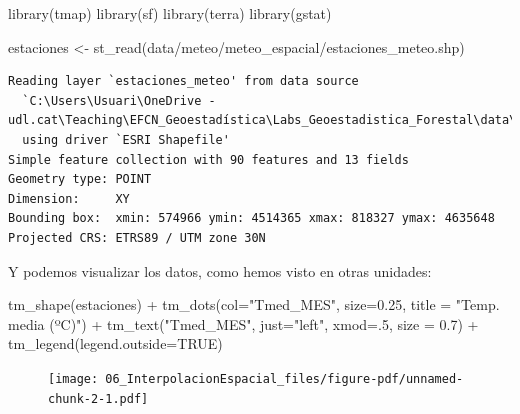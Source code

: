 \documentclass[
  letterpaper,
  DIV=11,
  numbers=noendperiod]{scrreprt}
\newenvironment{Shaded}{\begin{snugshade}}{\end{snugshade}}
\newcommand{\AttributeTok}[1]{\textcolor[rgb]{0.40,0.45,0.13}{#1}}
\newcommand{\ConstantTok}[1]{\textcolor[rgb]{0.56,0.35,0.01}{#1}}
\newcommand{\DecValTok}[1]{\textcolor[rgb]{0.68,0.00,0.00}{#1}}
\newcommand{\FloatTok}[1]{\textcolor[rgb]{0.68,0.00,0.00}{#1}}
\newcommand{\FunctionTok}[1]{\textcolor[rgb]{0.28,0.35,0.67}{#1}}
\newcommand{\NormalTok}[1]{\textcolor[rgb]{0.00,0.23,0.31}{#1}}
\newcommand{\OtherTok}[1]{\textcolor[rgb]{0.00,0.23,0.31}{#1}}
\newcommand{\SpecialCharTok}[1]{\textcolor[rgb]{0.37,0.37,0.37}{#1}}
\newcommand{\StringTok}[1]{\textcolor[rgb]{0.13,0.47,0.30}{#1}}
\begin{document}
\begin{Shaded}
\begin{Highlighting}[]
\FunctionTok{library}\NormalTok{(tmap)}
\FunctionTok{library}\NormalTok{(sf)}
\FunctionTok{library}\NormalTok{(terra)}
\FunctionTok{library}\NormalTok{(gstat)}


\NormalTok{estaciones }\OtherTok{\textless{}{-}} \FunctionTok{st\_read}\NormalTok{(}\StringTok{\textquotesingle{}data/meteo/meteo\_espacial/estaciones\_meteo.shp\textquotesingle{}}\NormalTok{)}
\end{Highlighting}
\end{Shaded}

\begin{verbatim}
Reading layer `estaciones_meteo' from data source 
  `C:\Users\Usuari\OneDrive - udl.cat\Teaching\EFCN_Geoestadística\Labs_Geoestadistica_Forestal\data\meteo\meteo_espacial\estaciones_meteo.shp' 
  using driver `ESRI Shapefile'
Simple feature collection with 90 features and 13 fields
Geometry type: POINT
Dimension:     XY
Bounding box:  xmin: 574966 ymin: 4514365 xmax: 818327 ymax: 4635648
Projected CRS: ETRS89 / UTM zone 30N
\end{verbatim}

Y podemos visualizar los datos, como hemos visto en otras unidades:

\begin{Shaded}
\begin{Highlighting}[]
\FunctionTok{tm\_shape}\NormalTok{(estaciones) }\SpecialCharTok{+}
    \FunctionTok{tm\_dots}\NormalTok{(}\AttributeTok{col=}\StringTok{"Tmed\_MES"}\NormalTok{, }\AttributeTok{size=}\FloatTok{0.25}\NormalTok{, }\AttributeTok{title =} \StringTok{"Temp. media (ºC)"}\NormalTok{) }\SpecialCharTok{+}
    \FunctionTok{tm\_text}\NormalTok{(}\StringTok{"Tmed\_MES"}\NormalTok{, }\AttributeTok{just=}\StringTok{"left"}\NormalTok{, }\AttributeTok{xmod=}\NormalTok{.}\DecValTok{5}\NormalTok{, }\AttributeTok{size =} \FloatTok{0.7}\NormalTok{) }\SpecialCharTok{+}
    \FunctionTok{tm\_legend}\NormalTok{(}\AttributeTok{legend.outside=}\ConstantTok{TRUE}\NormalTok{)}
\end{Highlighting}
\end{Shaded}

\begin{figure}[H]

{\centering \texttt{[image: 06\_InterpolacionEspacial\_files/figure-pdf/unnamed-chunk-2-1.pdf]}

}

\end{figure}
\end{document}
